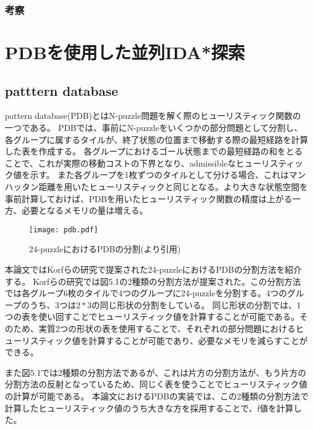 \documentclass[a4paper,11pt,oneside,openany]{jsbook}
\begin{document}
\subsection{考察}



\chapter{PDBを使用した並列IDA*探索}
\section{patttern database}
pattern database(PDB)\cite{CS98}とはN-puzzle問題を解く際のヒューリスティック関数の一つである。
PDBでは、事前にN-puzzleをいくつかの部分問題として分割し、各グループに属するタイルが、終了状態の位置まで移動する際の最短経路を計算した表を作成する。
各グループにおけるゴール状態までの最短経路の和をとることで、これが実際の移動コストの下界となり、admissibleなヒューリスティック値を示す。
また各グループを1枚ずつのタイルとして分ける場合、これはマンハッタン距離を用いたヒューリスティックと同じとなる。より大きな状態空間を事前計算しておけば、PDBを用いたヒューリスティック関数の精度は上がる一方、必要となるメモリの量は増える。

\begin{figure}[hbtp]
\begin{center}
\texttt{[image: pdb.pdf]}
\caption{24-puzzleにおけるPDBの分割(\cite{PDB}より引用)}
\end{center}
\end{figure}


本論文ではKorfらの研究\cite{KF02}で提案された24-puzzleにおけるPDBの分割方法を紹介する。
Korfらの研究\cite{KF02}では図5.1の2種類の分割方法が提案された。この分割方法では各グループ6枚のタイルで4つのグループに24-puzzleを分割する。4つのグループのうち、3つは$2*3$の同じ形状の分割をしている。
同じ形状の分割では、1つの表を使い回すことでヒューリスティック値を計算することが可能である。そのため、実質2つの形状の表を使用することで、それぞれの部分問題におけるヒューリスティック値を計算することが可能であり、必要なメモリを減らすことができる。

また図5.1では2種類の分割方法であるが、これは片方の分割方法が、もう片方の分割方法の反射となっているため、同じく表を使うことでヒューリスティック値の計算が可能である。
本論文におけるPDBの実装では、この2種類の分割方法で計算したヒューリスティック値のうち大きな方を採用することで、f値を計算した。
\end{document}
